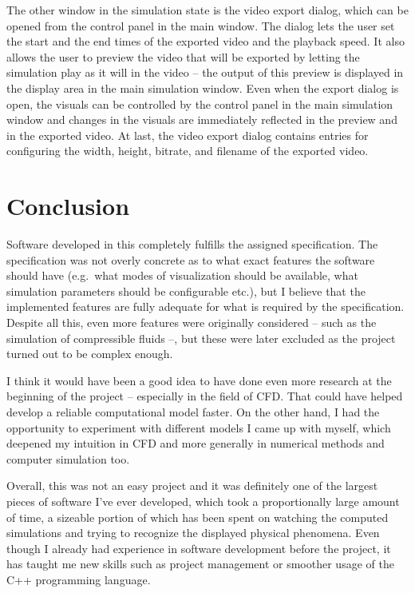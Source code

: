 \documentclass[11pt,a4paper,twoside,openright]{report}
\begin{document}
The other window in the simulation state is the video export dialog, which can be opened from the control panel in the main window. The dialog lets the user set the start and the end times of the exported video and the playback speed. It also allows the user to preview the video that will be exported by letting the simulation play as it will in the video -- the output of this preview is displayed in the display area in the main simulation window. Even when the export dialog is open, the visuals can be controlled by the control panel in the main simulation window and changes in the visuals are immediately reflected in the preview and in the exported video. At last, the video export dialog contains entries for configuring the width, height, bitrate, and filename of the exported video.

\chapter*{Conclusion}

\pagestyle{empty}

Software developed in this \this{} completely fulfills the assigned specification. The specification was not overly concrete as to what exact features the software should have (e.g.\ what modes of visualization should be available, what simulation parameters should be configurable etc.), but I believe that the implemented features are fully adequate for what is required by the specification. Despite all this, even more features were originally considered -- such as the simulation of compressible fluids --, but these were later excluded as the project turned out to be complex enough.

I think it would have been a good idea to have done even more research at the beginning of the project -- especially in the field of CFD. That could have helped develop a reliable computational model faster. On the other hand, I had the opportunity to experiment with different models I came up with myself, which deepened my intuition in CFD and more generally in numerical methods and computer simulation too.

Overall, this was not an easy project and it was definitely one of the largest pieces of software I've ever developed, which took a proportionally large amount of time, a sizeable portion of which has been spent on watching the computed simulations and trying to recognize the displayed physical phenomena. Even though I already had experience in software development before the project, it has taught me new skills such as project management or smoother usage of the C++ programming language.
\end{document}

